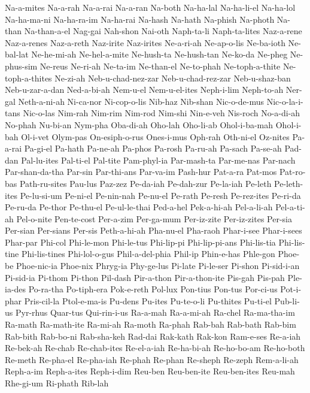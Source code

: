 {  Na-a-mites Na-a-rah Na-a-rai Na-a-ran Na-both Na-ha-lal
  Na-ha-li-el Na-ha-lol Na-ha-ma-ni Na-ha-ra-im Na-ha-rai Na-hash
  Na-hath Na-phish Na-photh Na-than Na-than-a-el Nag-gai
  Nah-shon Nai-oth Naph-ta-li Naph-ta-lites Naz-a-rene Naz-a-renes
  Naz-a-reth Naz-irite Naz-irites Ne-a-ri-ah Ne-ap-o-lis Ne-ba-ioth
  Ne-bal-lat Ne-he-mi-ah Ne-hel-a-mite Ne-hush-ta Ne-hush-tan Ne-ko-da
  Ne-pheg Ne-phus-sim Ne-reus Ne-ri-ah Ne-ta-im Ne-than-el
  Ne-to-phah Ne-toph-a-thite Ne-toph-a-thites Ne-zi-ah Neb-u-chad-nez-zar Neb-u-chad-rez-zar
  Neb-u-shaz-ban Neb-u-zar-a-dan Ned-a-bi-ah Nem-u-el Nem-u-el-ites Neph-i-lim
  Neph-to-ah Ner-gal Neth-a-ni-ah Ni-ca-nor Ni-cop-o-lis Nib-haz
  Nib-shan Nic-o-de-mus Nic-o-la-i-tans Nic-o-las Nim-rah Nim-rim
  Nim-rod Nim-shi Nin-e-veh Nis-roch No-a-di-ah No-phah
  Nu-bi-an Nym-pha Oba-di-ah Oho-lah Oho-li-ab Ohol-i-ba-mah
  Ohol-i-bah Ol-i-vet Olym-pas On-esiph-o-rus Ones-i-mus Oph-rah
  Oth-ni-el Oz-nites Pa-a-rai Pa-gi-el Pa-hath Pa-ne-ah
  Pa-phos Pa-rosh Pa-ru-ah Pa-sach Pa-se-ah Pad-dan
  Pal-lu-ites Pal-ti-el Pal-tite Pam-phyl-ia Par-mash-ta Par-me-nas
  Par-nach Par-shan-da-tha Par-sin Par-thi-ans Par-va-im Pash-hur
  Pat-a-ra Pat-mos Pat-ro-bas Path-ru-sites Pau-lus Paz-zez
  Pe-da-iah Pe-dah-zur Pe-la-iah Pe-leth Pe-leth-ites Pe-lu-si-um
  Pe-ni-el Pe-nin-nah Pe-nu-el Pe-rath Pe-resh Pe-rez-ites
  Pe-ri-da Pe-ru-da Pe-thor Pe-thu-el Pe-ul-le-thai Ped-a-hel
  Pek-a-hi-ah Pel-a-li-ah Pel-a-ti-ah Pel-o-nite Pen-te-cost Per-a-zim
  Per-ga-mum Per-iz-zite Per-iz-zites Per-sia Per-sian Per-sians
  Per-sis Peth-a-hi-ah Pha-nu-el Pha-raoh Phar-i-see Phar-i-sees
  Phar-par Phi-col Phi-le-mon Phi-le-tus Phi-lip-pi Phi-lip-pi-ans
  Phi-lis-tia Phi-lis-tine Phi-lis-tines Phi-lol-o-gus Phil-a-del-phia Phil-ip
  Phin-e-has Phle-gon Phoe-be Phoe-nic-ia Phoe-nix Phryg-ia
  Phy-ge-lus Pi-late Pi-le-ser Pi-shon Pi-sid-i-an Pi-sid-ia
  Pi-thom Pi-thon Pil-dash Pir-a-thon Pir-a-thon-ite Pis-gah
  Pis-pah Ple-ia-des Po-ra-tha Po-tiph-era Pok-e-reth Pol-lux
  Pon-tius Pon-tus Por-ci-us Pot-i-phar Pris-cil-la Ptol-e-ma-is
  Pu-dens Pu-ites Pu-te-o-li Pu-thites Pu-ti-el Pub-li-us
  Pyr-rhus Quar-tus Qui-rin-i-us Ra-a-mah Ra-a-mi-ah Ra-chel
  Ra-ma-tha-im Ra-math Ra-math-ite Ra-mi-ah Ra-moth Ra-phah
  Rab-bah Rab-bath Rab-bim Rab-bith Rab-bo-ni Rab-sha-keh
  Rad-dai Rak-kath Rak-kon Ram-e-ses Re-a-iah Re-bek-ah
  Re-chab Re-chab-ites Re-el-a-iah Re-ha-bi-ah Re-ho-bo-am Re-ho-both
  Re-meth Re-pha-el Re-pha-iah Re-phah Re-phan Re-sheph
  Re-zeph Rem-a-li-ah Reph-a-im Reph-a-ites Reph-i-dim Reu-ben
  Reu-ben-ite Reu-ben-ites Reu-mah Rhe-gi-um Ri-phath Rib-lah
}
